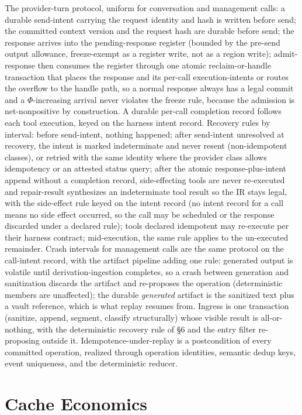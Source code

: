 \documentclass[11pt]{article}
\begin{document}
The provider-turn protocol, uniform for conversation and management calls: a durable send-intent carrying the request identity and hash is written before send; the committed context version and the request hash are durable before send; the response arrives into the pending-response register (bounded by the pre-send output allowance, freeze-exempt as a register write, not as a region write); admit-response then consumes the register through one atomic reclaim-or-handle transaction that places the response and its per-call execution-intents or routes the overflow to the handle path, so a normal response always has a legal commit and a $\Phi$-increasing arrival never violates the freeze rule, because the admission is net-nonpositive by construction. A durable per-call completion record follows each tool execution, keyed on the harness intent record. Recovery rules by interval: before send-intent, nothing happened; after send-intent unresolved at recovery, the intent is marked indeterminate and never resent (non-idempotent classes), or retried with the same identity where the provider class allows idempotency or an attested status query; after the atomic response-plus-intent append without a completion record, side-effecting tools are never re-executed and repair-result synthesizes an indeterminate tool result so the IR stays legal, with the side-effect rule keyed on the intent record (no intent record for a call means no side effect occurred, so the call may be scheduled or the response discarded under a declared rule); tools declared idempotent may re-execute per their harness contract; mid-execution, the same rule applies to the un-executed remainder. Crash intervals for management calls are the same protocol on the call-intent record, with the artifact pipeline adding one rule: generated output is volatile until derivation-ingestion completes, so a crash between generation and sanitization discards the artifact and re-proposes the operation (deterministic members are unaffected); the durable \emph{generated} artifact is the sanitized text plus a vault reference, which is what replay resumes from. Ingress is one transaction (sanitize, append, segment, classify structurally) whose visible result is all-or-nothing, with the deterministic recovery rule of \S6 and the entry filter re-proposing outside it. Idempotence-under-replay is a postcondition of every committed operation, realized through operation identities, semantic dedup keys, event uniqueness, and the deterministic reducer.

\section{Cache Economics}
\label{sec:cache}
\end{document}
